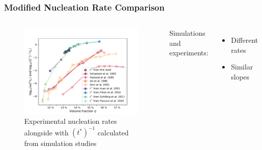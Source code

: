 \documentclass[smaller,notes=hide]{beamer}
\newlength{\wideitemsep}
\let\olditem\item
\renewcommand{\item}{\setlength{\itemsep}{\wideitemsep}\olditem}
\begin{document}
\begin{frame}
\frametitle{Modified Nucleation Rate Comparison}

\begin{columns}
\begin{figure}[h]
\centering
\includegraphics[width=1.0 \linewidth]{mod_nucleation_comparison_v2.pdf}
\caption[Nucleation rate comparison under assumption of early filled boxes]{Experimental nucleation rates\cite{Harland1997,He1996,schaetzel1993,Sinn2001,Auer2001} alongside with $(t^*)^{-1}$ calculated from simulation studies\cite{Filion2010a,Fiorucci2020a,Schilling2011}}
\label{fig:nucleation_rate_comparison_modified}
\end{figure}


Simulations and experiments:\\

\begin{itemize}
\item Different rates
\item Similar slopes
\end{itemize}
\end{columns}






\end{frame}
\end{document}
